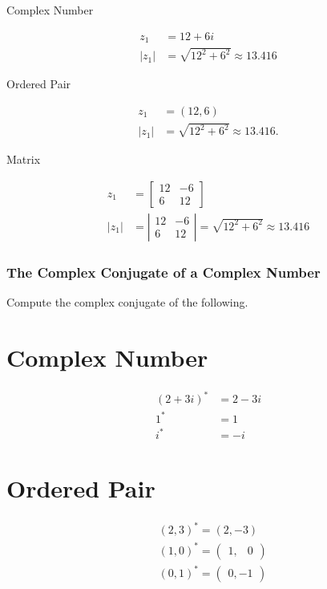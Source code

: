 Complex Number

$$
\begin{aligned}
z_{1} & =12+6 i \\
\left|z_{1}\right| & =\sqrt{12^{2}+6^{2}} \approx 13.416
\end{aligned}
$$

Ordered Pair

$$
\begin{aligned}
z_{1} & =(12,6) \\
\left|z_{1}\right| & =\sqrt{12^{2}+6^{2}} \approx 13.416 .
\end{aligned}
$$

Matrix

$$
\begin{aligned}
z_{1} & =\left[\begin{array}{cc}
12 & -6 \\
6 & 12
\end{array}\right] \\
\left|z_{1}\right| & =\left|\begin{array}{cc}
12 & -6 \\
6 & 12
\end{array}\right|=\sqrt{12^{2}+6^{2}} \approx 13.416
\end{aligned}
$$

\subsubsection{The Complex Conjugate of a Complex Number}
Compute the complex conjugate of the following.

\section{Complex Number}
$$
\begin{aligned}
(2+3 i)^{*} & =2-3 i \\
1^{*} & =1 \\
i^{*} & =-i
\end{aligned}
$$

\section{Ordered Pair}
$$
\begin{aligned}
& (2,3)^{*}=(2,-3) \\
& (1,0)^{*}=\left(\begin{array}{ll}
1, & 0
\end{array}\right) \\
& (0,1)^{*}=\left(\begin{array}{ll}
0,-1
\end{array}\right)
\end{aligned}
$$

